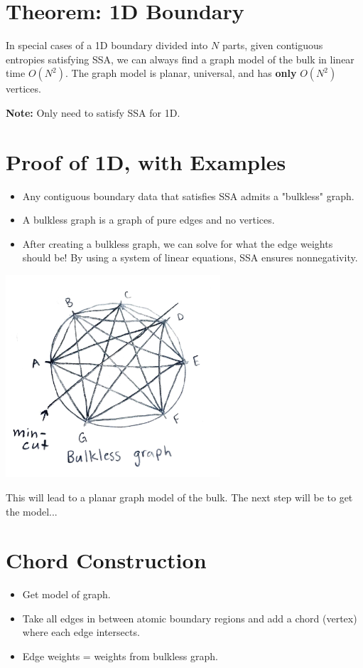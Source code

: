 \documentclass[12pt]{article}
\begin{document}
\section*{Theorem: 1D Boundary}
In special cases of a 1D boundary divided into \( N \) parts, given contiguous entropies satisfying SSA, we can always find a graph model of the bulk in linear time \( O(N^2) \). The graph model is planar, universal, and has \textbf{only} \( O(N^2) \) vertices.

\textbf{Note:} Only need to satisfy SSA for 1D.

\section*{Proof of 1D, with Examples}
\begin{itemize}
    \item Any contiguous boundary data that satisfies SSA admits a "bulkless" graph.
    \item A bulkless graph is a graph of pure edges and no vertices.
    \item After creating a bulkless graph, we can solve for what the edge weights should be! By using a system of linear equations, SSA ensures nonnegativity.
\end{itemize}


\begin{center}
    \includegraphics[width=0.6\textwidth]{bulkless_graph.pdf}
\end{center}

This will lead to a planar graph model of the bulk. The next step will be to get the model...

\section*{Chord Construction}
\begin{itemize}
    \item Get model of graph.
    \item Take all edges in between atomic boundary regions and add a chord (vertex) where each edge intersects.
    \item Edge weights = weights from bulkless graph.
\end{itemize}
\end{document}
